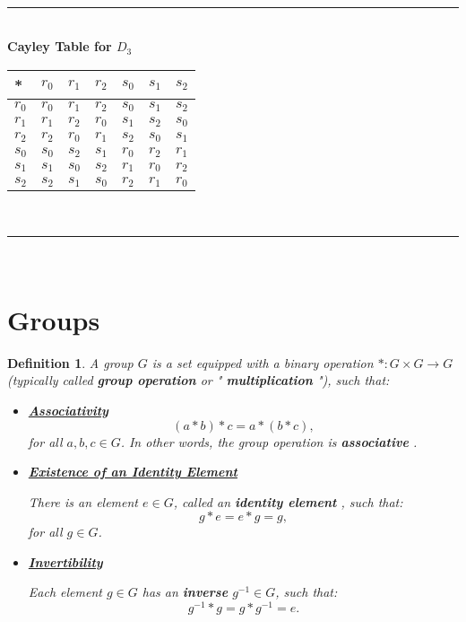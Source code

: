 \documentclass[a4paper,12pt]{report}
\newcommand{\ra}{\longrightarrow}
\newcounter{statement}
\numberwithin{statement}{chapter}
\newtheorem{defn}[statement]{Definition}
\numberwithin{equation}{chapter}
\numberwithin{section}{chapter}
\numberwithin{subsection}{section}
\begin{document}
\quad\\\hrule
\quad\\





\textbf{Cayley Table for $D_3$}



\begin{center}
\begin{tabular}{||}
\hline

*
&$r_0$&$r_1$&$r_2$&$s_0$&$s_1$&$s_2$ \\
\hline
$r_0$&$r_0$&$r_1$&$r_2$&$s_0$&$s_1$&$s_2$ \\
\hline
$r_1$&$r_1$&$r_2$&$r_0$&$s_1$&$s_2$&$s_0$ \\
\hline
$r_2$&$r_2$&$r_0$&$r_1$&$s_2$&$s_0$&$s_1$ \\
\hline
$s_0$&$s_0$&$s_2$&$s_1$&$r_0$&$r_2$&$r_1$ \\
\hline
$s_1$&$s_1$&$s_0$&$s_2$&$r_1$&$r_0$&$r_2$ \\
\hline
$s_2$&$s_2$&$s_1$&$s_0$&$r_2$&$r_1$&$r_0$\\\hline
\end{tabular}
\end{center}



\quad\\\hrule
\quad\\
\section*{Groups}

\begin{defn}
A group $G$ is a set equipped with a binary operation $*: G \times G \ra G$ (typically called  {\bf  group operation}  or " {\bf multiplication} "), such that:
\begin{itemize}
\item 
 \underline{  {\bf Associativity} } 
\[(a* b)* c = a * (b * c),\]
for all $a, b, c \in G$. In other words, the group operation is  {\bf associative} .

\item 
 \underline{  {\bf Existence of an Identity Element} } 



There is an element $e \in G$, called an  {\bf identity element} , such that:
\[g* e = e * g = g,\]
for all $g \in G$.

\item 
 \underline{  {\bf Invertibility} } 



Each element $g \in G$ has an  {\bf inverse}  $g^{-1} \in G$, such that:
\[g^{-1}* g = g* g^{-1} = e.\]
\end{itemize}
\end{defn}
\end{document}
